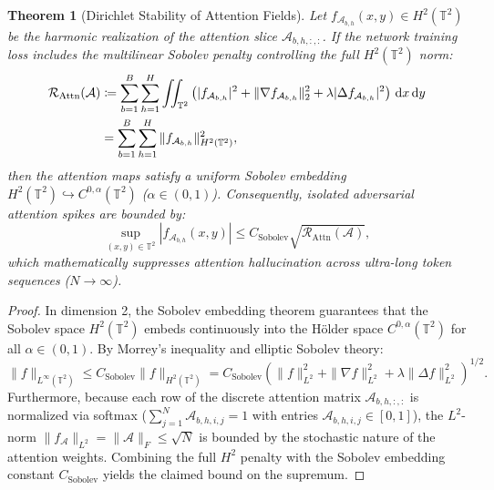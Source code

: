 \documentclass[11pt,a4paper,reqno]{amsart}
\newtheorem{theorem}{Theorem}[section]
\theoremstyle{definition}
\numberwithin{equation}{section}
\newcommand{\Tor}{\mathbb{T}}
\newcommand{\dif}{\,\mathrm{d}}
\begin{document}
\begin{theorem}[Dirichlet Stability of Attention Fields]
\label{thm:attention_sobolev}
Let $f_{\mathcal{A}_{b,h}}(x, y) \in H^2(\Tor^2)$ be the harmonic realization of the attention slice $\mathcal{A}_{b, h, :, :}$. If the network training loss includes the multilinear Sobolev penalty controlling the full $H^2(\Tor^2)$ norm:
\begin{align}
    \mathcal{R}_{\mathrm{Attn}}(\mathcal{A}) &\coloneqq \sum_{b=1}^B \sum_{h=1}^H \iint_{\Tor^2} \left( |f_{\mathcal{A}_{b,h}}|^2 + \|\nabla f_{\mathcal{A}_{b,h}}\|_2^2 + \lambda |\Delta f_{\mathcal{A}_{b,h}}|^2 \right) \dif x \dif y \notag \\
    &= \sum_{b=1}^B \sum_{h=1}^H \|f_{\mathcal{A}_{b,h}}\|_{H^2(\Tor^2)}^2,
\end{align}
then the attention maps satisfy a uniform Sobolev embedding $H^2(\Tor^2) \hookrightarrow C^{0, \alpha}(\Tor^2)$ ($\alpha \in (0, 1)$). Consequently, isolated adversarial attention spikes are bounded by:
\begin{equation}
    \sup_{(x, y) \in \Tor^2} |f_{\mathcal{A}_{b,h}}(x, y)| \le C_{\mathrm{Sobolev}} \sqrt{\mathcal{R}_{\mathrm{Attn}}(\mathcal{A})},
\end{equation}
which mathematically suppresses attention hallucination across ultra-long token sequences ($N \to \infty$).
\end{theorem}
\begin{proof}
In dimension 2, the Sobolev embedding theorem guarantees that the Sobolev space $H^2(\Tor^2)$ embeds continuously into the H\"older space $C^{0, \alpha}(\Tor^2)$ for all $\alpha \in (0, 1)$. By Morrey's inequality and elliptic Sobolev theory:
\begin{equation}
    \|f\|_{L^\infty(\Tor^2)} \le C_{\mathrm{Sobolev}} \|f\|_{H^2(\Tor^2)} = C_{\mathrm{Sobolev}} \left( \|f\|_{L^2}^2 + \|\nabla f\|_{L^2}^2 + \lambda \|\Delta f\|_{L^2}^2 \right)^{1/2}.
\end{equation}
Furthermore, because each row of the discrete attention matrix $\mathcal{A}_{b,h,:,:}$ is normalized via softmax ($\sum_{j=1}^N \mathcal{A}_{b,h,i,j} = 1$ with entries $\mathcal{A}_{b,h,i,j} \in [0,1]$), the $L^2$-norm $\|f_{\mathcal{A}}\|_{L^2} = \|\mathcal{A}\|_F \le \sqrt{N}$ is bounded by the stochastic nature of the attention weights. Combining the full $H^2$ penalty with the Sobolev embedding constant $C_{\mathrm{Sobolev}}$ yields the claimed bound on the supremum.
\end{proof}
\end{document}
